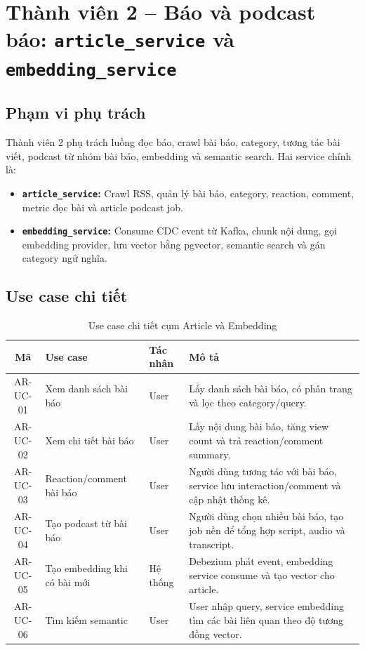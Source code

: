 \documentclass[14pt,a4paper,oneside]{extreport}
\begin{document}
\section{Thành viên 2 -- Báo và podcast báo: \texttt{article\_service} và \texttt{embedding\_service}}
\label{sec:phase3-article-embedding}

\subsection{Phạm vi phụ trách}

Thành viên 2 phụ trách luồng đọc báo, crawl bài báo, category, tương tác bài viết, podcast từ nhóm bài báo, embedding và semantic search. Hai service chính là:

\begin{itemize}[leftmargin=2cm]
  \item \textbf{\texttt{article\_service}:} Crawl RSS, quản lý bài báo, category, reaction, comment, metric đọc bài và article podcast job.
  \item \textbf{\texttt{embedding\_service}:} Consume CDC event từ Kafka, chunk nội dung, gọi embedding provider, lưu vector bằng pgvector, semantic search và gán category ngữ nghĩa.
\end{itemize}

\subsection{Use case chi tiết}

\begin{table}[H]
\centering
\caption{Use case chi tiết cụm Article và Embedding}
\label{tab:uc-article-embedding}
\renewcommand{\arraystretch}{1.3}
\small
\begin{tabularx}{\textwidth}{|c|l|l|X|}
\hline
\textbf{Mã} & \textbf{Use case} & \textbf{Tác nhân} & \textbf{Mô tả} \\
\hline
AR-UC-01 & Xem danh sách bài báo & User & Lấy danh sách bài báo, có phân trang và lọc theo category/query. \\
\hline
AR-UC-02 & Xem chi tiết bài báo & User & Lấy nội dung bài báo, tăng view count và trả reaction/comment summary. \\
\hline
AR-UC-03 & Reaction/comment bài báo & User & Người dùng tương tác với bài báo, service lưu interaction/comment và cập nhật thống kê. \\
\hline
AR-UC-04 & Tạo podcast từ bài báo & User & Người dùng chọn nhiều bài báo, tạo job nền để tổng hợp script, audio và transcript. \\
\hline
AR-UC-05 & Tạo embedding khi có bài mới & Hệ thống & Debezium phát event, embedding service consume và tạo vector cho article. \\
\hline
AR-UC-06 & Tìm kiếm semantic & User & User nhập query, service embedding tìm các bài liên quan theo độ tương đồng vector. \\
\hline
\end{tabularx}
\end{table}
\end{document}
